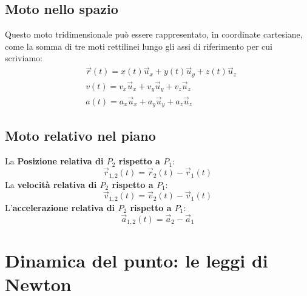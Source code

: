 \documentclass{article}
\numberwithin{equation}{subsection}
\begin{document}
  \subsection{Moto nello spazio}
  Questo moto tridimensionale può essere rappresentato, in coordinate cartesiane, come la somma di tre moti rettilinei lungo gli assi di riferimento per cui scriviamo:
  \begin{align}
      & \vec{r}(t)=x(t)\vec{u}_x + y(t)\vec{u}_y + z(t)\vec{u}_z \\
      & v(t)= v_x\vec{u}_x +v_y\vec{u}_y + v_z\vec{u}_z \\
      & a(t) = a_x\vec{u}_x+a_y\vec{u}_y+a_z\vec{u}_z
  \end{align}
  \subsection{Moto relativo nel piano}
  La \textbf{Posizione relativa di $P_2$ rispetto a $P_1$}:
  \begin{equation}
      \vec{r}_{1,2}(t)=\vec{r}_2(t)-\vec{r}_1(t) 
  \end{equation}
    La \textbf{velocità relativa di $P_2$ rispetto a $P_1$}:
    \begin{equation}
        \vec{v}_{1,2}(t)=\vec{v}_2(t)-\vec{v}_1(t)
    \end{equation}
 L'\textbf{accelerazione relativa di $P_2$ rispetto a $P_1$}:
 \begin{equation}
     \vec{a}_{1,2}(t)=\vec{a}_2-\vec{a}_1
 \end{equation}
 \section{Dinamica del punto: le leggi di Newton}
\end{document}
